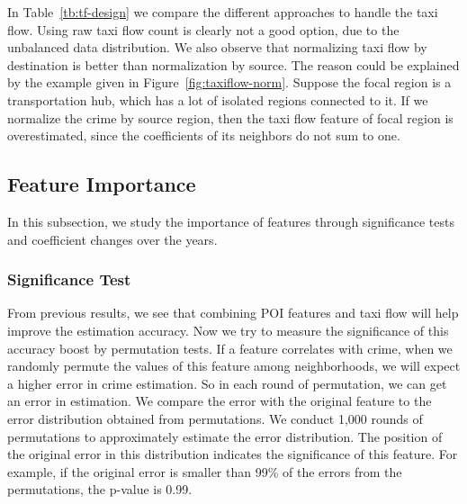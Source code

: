 In Table~\ref{tb:tf-design} we compare the different approaches to handle the taxi flow. Using raw taxi flow count is clearly not a good option, due to the unbalanced data distribution. We also observe that normalizing taxi flow by destination is better than normalization by source. The reason could be explained by the example given in Figure~\ref{fig:taxiflow-norm}. Suppose the focal region is a transportation hub, which has a lot of isolated regions connected to it. If we normalize the crime by source region, then the taxi flow feature of focal region is overestimated, since the coefficients of its neighbors do not sum to one. 




\subsection{Feature Importance}

In this subsection, we study the importance of features through significance tests and coefficient changes over the years.


\subsubsection{Significance Test} 
From previous results, we see that combining POI features and taxi flow will help improve the estimation accuracy. Now we try to measure the significance of this accuracy boost by permutation tests. If a feature correlates with crime, when we randomly permute the values of this feature among neighborhoods, we will expect a higher error in crime estimation. So in each round of permutation, we can get an error in estimation. We compare the error with the original feature to the error distribution obtained from permutations. We conduct 1,000 rounds of permutations to approximately estimate the error distribution. The position of the original error in this distribution indicates the significance of this feature. For example, if the original error is smaller than 99\% of the errors from the permutations, the p-value is 0.99. 



